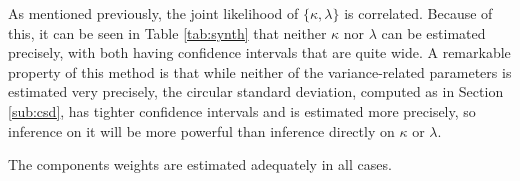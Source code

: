 As mentioned previously, the joint likelihood of \( \{\kappa, \lambda\}\) is correlated. Because of this, it can be seen in Table \ref{tab:synth} that neither \(\kappa\) nor \(\lambda\) can be estimated precisely, with both having confidence intervals that are quite wide. A remarkable property of this method is that while neither of the variance-related parameters is estimated very precisely, the circular standard deviation, computed as in Section \ref{sub:csd}, has tighter confidence intervals and is estimated more precisely, so inference on it will be more powerful than inference directly on \(\kappa\) or \(\lambda\).

The components weights are estimated adequately in all cases.











